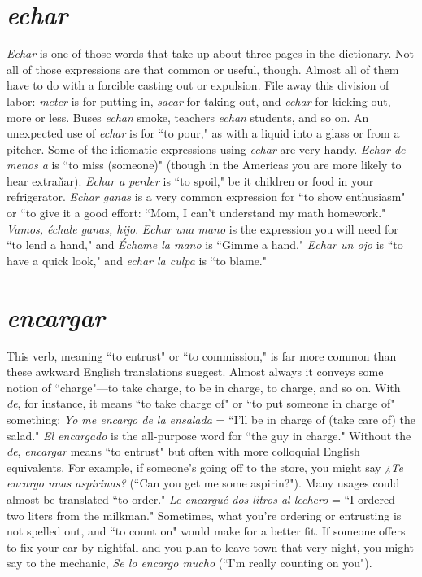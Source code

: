 \section{\emph{echar}}

\emph{Echar} is one of those words that take up about three pages in
the dictionary. Not all of those expressions are that common or useful,
though. Almost all of them have to do with a forcible casting out or
expulsion. File away this division of labor: \emph{meter} is for putting in, \emph{sacar} for taking out, and \emph{echar} for kicking out, more or less. Buses \emph{echan}
smoke, teachers \emph{echan} students, and so on. An unexpected use of
\emph{echar} is for ``to pour," as with a liquid into a glass or from a pitcher.
Some of the idiomatic expressions using \emph{echar} are very handy. \emph{Echar
	de menos a} is ``to miss (someone)" (though in the Americas you are
more likely to hear extrañar). \emph{Echar a perder} is ``to spoil," be it children or food in your refrigerator. \emph{Echar ganas} is a very common
expression for ``to show enthusiasm" or ``to give it a good effort: ``Mom,
I can't understand my math homework." \emph{Vamos, échale ganas, hijo}.
\emph{Echar una mano} is the expression you will need for ``to lend a hand,"
and \emph{Échame la mano} is ``Gimme a hand." \emph{Echar un ojo} is ``to have a
quick look," and \emph{echar la culpa} is ``to blame."

\section{\emph{encargar}}

This verb, meaning ``to entrust" or ``to commission," is far
more common than these awkward English translations suggest. Almost always it conveys some notion of ``charge"---to take charge, to be
in charge, to charge, and so on. With \emph{de}, for instance, it means ``to take
charge of" or ``to put someone in charge of" something: \emph{Yo me encargo
	de la ensalada} = ``I'll be in charge of (take care of) the salad." \emph{El encargado} is the all-purpose word for ``the guy in charge." Without the
\emph{de}, \emph{encargar} means ``to entrust" but often with more colloquial English equivalents. For example, if someone's going off to the store, you
might say \emph{¿Te encargo unas aspirinas?} (``Can you get me some aspirin?"). Many usages could almost be translated ``to order." \emph{Le encargué
	dos litros al lechero} = ``I ordered two liters from the milkman." Sometimes, what you're ordering or entrusting is not spelled out, and ``to
count on" would make for a better fit. If someone offers to fix your car
by nightfall and you plan to leave town that very night, you might say
to the mechanic, \emph{Se lo encargo mucho} (``I'm really counting on you").

